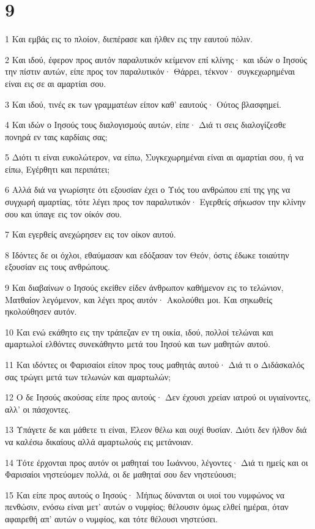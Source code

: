 \chapter{9}

\par 1 Και εμβάς εις το πλοίον, διεπέρασε και ήλθεν εις την εαυτού πόλιν.
\par 2 Και ιδού, έφερον προς αυτόν παραλυτικόν κείμενον επί κλίνης· και ιδών ο Ιησούς την πίστιν αυτών, είπε προς τον παραλυτικόν· Θάρρει, τέκνον· συγκεχωρημέναι είναι εις σε αι αμαρτίαι σου.
\par 3 Και ιδού, τινές εκ των γραμματέων είπον καθ' εαυτούς· Ούτος βλασφημεί.
\par 4 Και ιδών ο Ιησούς τους διαλογισμούς αυτών, είπε· Διά τι σεις διαλογίζεσθε πονηρά εν ταις καρδίαις σας;
\par 5 Διότι τι είναι ευκολώτερον, να είπω, Συγκεχωρημέναι είναι αι αμαρτίαι σου, ή να είπω, Εγέρθητι και περιπάτει;
\par 6 Αλλά διά να γνωρίσητε ότι εξουσίαν έχει ο Υιός του ανθρώπου επί της γης να συγχωρή αμαρτίας, τότε λέγει προς τον παραλυτικόν· Εγερθείς σήκωσον την κλίνην σου και ύπαγε εις τον οίκόν σου.
\par 7 Και εγερθείς ανεχώρησεν εις τον οίκον αυτού.
\par 8 Ιδόντες δε οι όχλοι, εθαύμασαν και εδόξασαν τον Θεόν, όστις έδωκε τοιαύτην εξουσίαν εις τους ανθρώπους.
\par 9 Και διαβαίνων ο Ιησούς εκείθεν είδεν άνθρωπον καθήμενον εις το τελώνιον, Ματθαίον λεγόμενον, και λέγει προς αυτόν· Ακολούθει μοι. Και σηκωθείς ηκολούθησεν αυτόν.
\par 10 Και ενώ εκάθητο εις την τράπεζαν εν τη οικία, ιδού, πολλοί τελώναι και αμαρτωλοί ελθόντες συνεκάθηντο μετά του Ιησού και των μαθητών αυτού.
\par 11 Και ιδόντες οι Φαρισαίοι είπον προς τους μαθητάς αυτού· Διά τι ο Διδάσκαλός σας τρώγει μετά των τελωνών και αμαρτωλών;
\par 12 Ο δε Ιησούς ακούσας είπε προς αυτούς· Δεν έχουσι χρείαν ιατρού οι υγιαίνοντες, αλλ' οι πάσχοντες.
\par 13 Υπάγετε δε και μάθετε τι είναι, Έλεον θέλω και ουχί θυσίαν. Διότι δεν ήλθον διά να καλέσω δικαίους αλλά αμαρτωλούς εις μετάνοιαν.
\par 14 Τότε έρχονται προς αυτόν οι μαθηταί του Ιωάννου, λέγοντες· Διά τι ημείς και οι Φαρισαίοι νηστεύομεν πολλά, οι δε μαθηταί σου δεν νηστεύουσι;
\par 15 Και είπε προς αυτούς ο Ιησούς· Μήπως δύνανται οι υιοί του νυμφώνος να πενθώσιν, ενόσω είναι μετ' αυτών ο νυμφίος; θέλουσιν όμως ελθεί ημέραι, όταν αφαιρεθή απ' αυτών ο νυμφίος, και τότε θέλουσι νηστεύσει.
